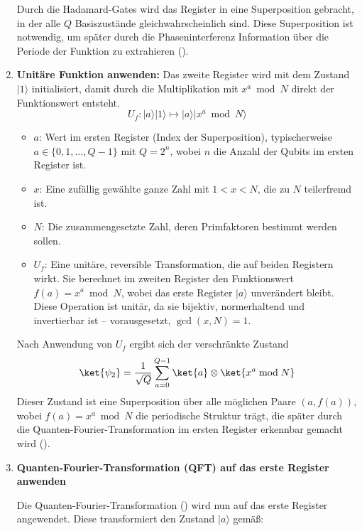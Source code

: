 \begin{enumerate}
  Durch die Hadamard-Gates wird das Register in eine Superposition gebracht, in der alle \( Q \) Basiszustände gleichwahrscheinlich sind. Diese Superposition ist notwendig, um später durch die Phaseninterferenz Information über die Periode der Funktion zu extrahieren (\cite[5-6, 15-16]{shor_polynomial-time_1994}).\\
 \item \textbf{Unitäre Funktion anwenden:} 
  Das zweite Register wird mit dem Zustand \( |1\rangle \) initialisiert, damit durch die Multiplikation mit \( x^a \bmod N \) direkt der Funktionswert entsteht.
\[
U_f \colon |a\rangle|1\rangle \mapsto |a\rangle|x^a \bmod N\rangle
\]
\begin{itemize}
    \item \textbf{\( a \)}: Wert im ersten Register (Index der Superposition), typischerweise \( a \in \{0, 1, \dotsc, Q-1\} \) mit \( Q = 2^n \), wobei \( n \) die Anzahl der Qubits im ersten Register ist.
    \item \textbf{\( x \)}: Eine zufällig gewählte ganze Zahl mit \( 1 < x < N \), die zu \( N \) teilerfremd ist.
    \item \textbf{\( N \)}: Die zusammengesetzte Zahl, deren Primfaktoren bestimmt werden sollen.
    \item \textbf{\( U_f \)}: Eine unitäre, reversible Transformation, die auf beiden Registern wirkt. Sie berechnet im zweiten Register den Funktionswert \( f(a) = x^a \bmod N \), wobei das erste Register \( |a\rangle \) unverändert bleibt. Diese Operation ist unitär, da sie bijektiv, normerhaltend und invertierbar ist – vorausgesetzt, \( \gcd(x, N) = 1 \).
\end{itemize}

Nach Anwendung von \( U_f \) ergibt sich der verschränkte Zustand
\[
\ket{\psi_2} = \frac{1}{\sqrt{Q}} \sum_{a=0}^{Q-1} \ket{a} \otimes \ket{x^a \bmod N}
\]
Dieser Zustand ist eine Superposition über alle möglichen Paare \( (a, f(a)) \), wobei \( f(a) = x^a \bmod N \) die periodische Struktur trägt, die später durch die Quanten-Fourier-Transformation im ersten Register erkennbar gemacht wird (\cite[16]{shor_polynomial-time_1994}).\\

\item \textbf{Quanten-Fourier-Transformation (QFT) auf das erste Register anwenden}

\noindent Die Quanten-Fourier-Transformation (\cite[13-15,17]{shor_polynomial-time_1994}) wird nun auf das erste Register angewendet. Diese transformiert den Zustand \( |a\rangle \) gemäß:


\end{enumerate}
